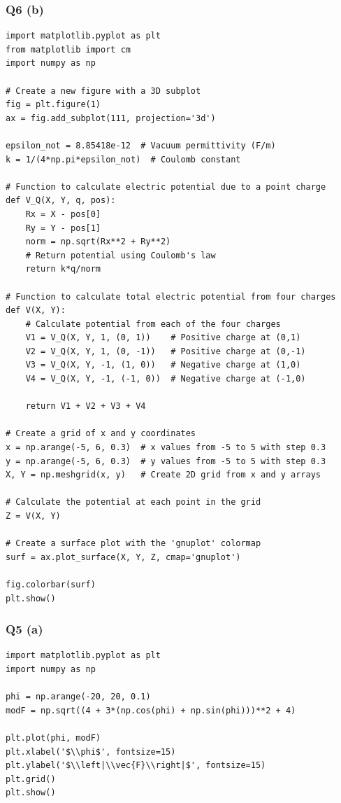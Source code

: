 \documentclass[12pt]{article}
\begin{document}
\subsubsection*{Q6 (b)}
\begin{verbatim}
import matplotlib.pyplot as plt
from matplotlib import cm
import numpy as np

# Create a new figure with a 3D subplot
fig = plt.figure(1)
ax = fig.add_subplot(111, projection='3d')

epsilon_not = 8.85418e-12  # Vacuum permittivity (F/m)
k = 1/(4*np.pi*epsilon_not)  # Coulomb constant

# Function to calculate electric potential due to a point charge
def V_Q(X, Y, q, pos):
    Rx = X - pos[0]
    Ry = Y - pos[1]
    norm = np.sqrt(Rx**2 + Ry**2)
    # Return potential using Coulomb's law
    return k*q/norm

# Function to calculate total electric potential from four charges
def V(X, Y):
    # Calculate potential from each of the four charges
    V1 = V_Q(X, Y, 1, (0, 1))    # Positive charge at (0,1)
    V2 = V_Q(X, Y, 1, (0, -1))   # Positive charge at (0,-1)
    V3 = V_Q(X, Y, -1, (1, 0))   # Negative charge at (1,0)
    V4 = V_Q(X, Y, -1, (-1, 0))  # Negative charge at (-1,0)

    return V1 + V2 + V3 + V4

# Create a grid of x and y coordinates
x = np.arange(-5, 6, 0.3)  # x values from -5 to 5 with step 0.3
y = np.arange(-5, 6, 0.3)  # y values from -5 to 5 with step 0.3
X, Y = np.meshgrid(x, y)   # Create 2D grid from x and y arrays

# Calculate the potential at each point in the grid
Z = V(X, Y)

# Create a surface plot with the 'gnuplot' colormap
surf = ax.plot_surface(X, Y, Z, cmap='gnuplot')

fig.colorbar(surf)
plt.show()
\end{verbatim}

\subsubsection*{Q5 (a)}
\begin{verbatim}
import matplotlib.pyplot as plt
import numpy as np

phi = np.arange(-20, 20, 0.1)
modF = np.sqrt((4 + 3*(np.cos(phi) + np.sin(phi)))**2 + 4)

plt.plot(phi, modF)
plt.xlabel('$\\phi$', fontsize=15)
plt.ylabel('$\\left|\\vec{F}\\right|$', fontsize=15)
plt.grid()
plt.show()
\end{verbatim}
\end{document}
